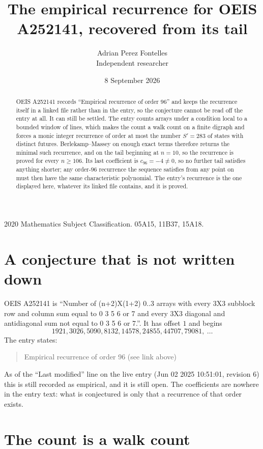 \documentclass[11pt,a4paper]{article}
\title{The empirical recurrence for OEIS A252141, recovered from its tail}
\author{Adrian Perez Fontelles\\ \small Independent researcher}
\date{8 September 2026}
\theoremstyle{plain}
\theoremstyle{definition}
\begin{document}
\maketitle

\begin{abstract}
OEIS A252141 records ``Empirical recurrence of order $96$'' and keeps the recurrence itself in
a linked file rather than in the entry, so the conjecture cannot be read off the entry at all.
It can still be settled. The entry counts arrays under a condition local to a bounded window of
lines, which makes the count a walk count on a finite digraph and forces a monic integer
recurrence of order at most the number $S'=283$ of states with distinct futures. Berlekamp--Massey on
enough exact terms therefore returns the minimal such recurrence, and on the tail beginning at $n=10$, so the recurrence is proved for every $n\ge106$.
Its last coefficient is $c_{96}=-4\neq0$, so no further tail satisfies anything
shorter; any order-$96$ recurrence the sequence satisfies from any point on must then have
the same characteristic polynomial. The entry's recurrence is the one displayed here, whatever
its linked file contains, and it is proved.
\end{abstract}

\noindent\small 2020 Mathematics Subject Classification. 05A15, 11B37, 15A18.\normalsize

\section{A conjecture that is not written down}

OEIS A252141 is ``Number of (n+2)X(1+2) 0..3 arrays with every 3X3 subblock row and column sum equal to 0 3 5 6 or 7 and every 3X3 diagonal and antidiagonal sum not equal to 0 3 5 6 or 7.''. It has offset $1$ and begins
\[
1921, 3026, 5090, 8132, 14578, 24855, 44707, 79081,\ \dots
\]
The entry states:
\begin{quote}
Empirical recurrence of order 96 (see link above)
\end{quote}
As of the ``Last modified'' line on the live entry (Jun 02 2025 10:51:01, revision 6)
this is still recorded as empirical, and it is still open. The coefficients are nowhere in the
entry text: what is conjectured is only that a recurrence of that order exists.

\section{The count is a walk count}
\end{document}
